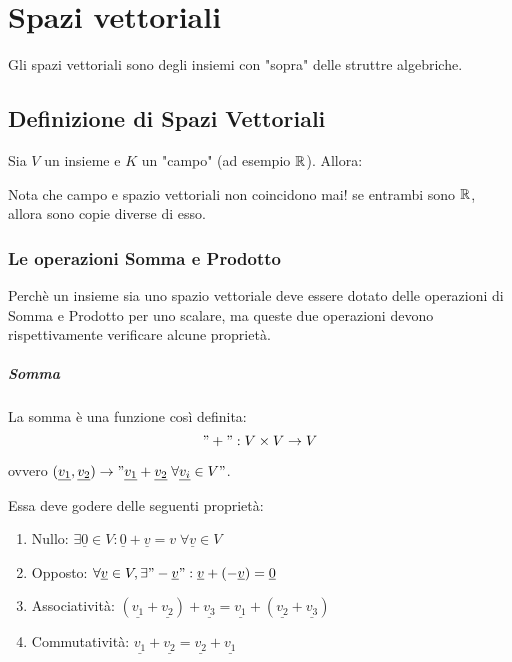 \chapter{Spazi vettoriali}
Gli spazi vettoriali sono degli insiemi con "sopra" delle struttre algebriche.

\section{Definizione di Spazi Vettoriali}
Sia $V$ un insieme e $K$ un "campo" (ad esempio $\mathbb{R}$).
Allora:

Nota che campo e spazio vettoriali non coincidono mai! se entrambi sono $\mathbb{R}$, allora sono copie diverse di esso.
\subsection{Le operazioni Somma e Prodotto}
Perchè un insieme sia uno spazio vettoriale deve essere dotato delle operazioni di Somma e Prodotto per uno scalare,
ma queste due operazioni devono rispettivamente verificare alcune proprietà.

\paragraph{Somma}
La somma è una funzione così definita:
\["+" : V \times V \to V \]
\begin{center}
    ovvero $(\underline{v_1}, \underline{v_2} ) \to "\underline{v_1} + \underline{v_2}\; \forall \underline{v_i} \in V"$.
\end{center}
    Essa deve godere delle seguenti proprietà:
\begin{enumerate}
    \item Nullo: $\exists \underline{0} \in V : \underline{0} + \underline{v} = v \; \forall \underline{v} \in V$
    \item Opposto: $\forall \underline{v} \in V, \exists "-\underline{v}" : \underline{v} + (-\underline{v}) = \underline{0}$
    \item Associatività: $(\underline{v_1} + \underline{v_2}) + \underline{v_3} = \underline{v_1} + (\underline{v_2} + \underline{v_3})$
    \item Commutatività: $\underline{v_1} + \underline{v_2} = \underline{v_2} + \underline{v_1}$
\end{enumerate}


